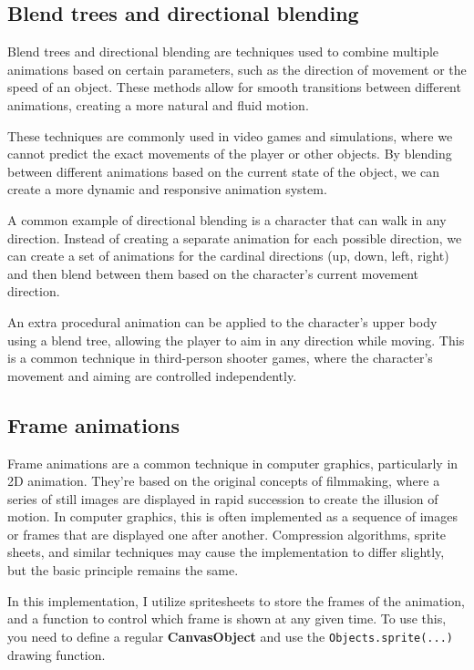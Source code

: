 \subsection{Blend trees and directional blending}
\label{subsec:blend-trees-directional-blending}

Blend trees and directional blending are techniques used to combine multiple animations based on certain parameters, such as the direction of movement or the speed of an object. These methods allow for smooth transitions between different animations, creating a more natural and fluid motion.

These techniques are commonly used in video games and simulations, where we cannot predict the exact movements of the player or other objects. By blending between different animations based on the current state of the object, we can create a more dynamic and responsive animation system.

A common example of directional blending is a character that can walk in any direction. Instead of creating a separate animation for each possible direction, we can create a set of animations for the cardinal directions (up, down, left, right) and then blend between them based on the character's current movement direction.

An extra procedural animation can be applied to the character's upper body using a blend tree, allowing the player to aim in any direction while moving. This is a common technique in third-person shooter games, where the character's movement and aiming are controlled independently.

\vspace{60pt}

\subsection{Frame animations}
\label{subsec:frame-animations}

Frame animations are a common technique in computer graphics, particularly in 2D animation. They're based on the original concepts of filmmaking, where a series of still images are displayed in rapid succession to create the illusion of motion. In computer graphics, this is often implemented as a sequence of images or frames that are displayed one after another. Compression algorithms, sprite sheets, and similar techniques may cause the implementation to differ slightly, but the basic principle remains the same.

\begin{Note}
    In this implementation, I utilize spritesheets to store the frames of the animation, and a function to control which frame is shown at any given time. To use this, you need to define a regular \textbf{CanvasObject} and use the {\footnotesize\texttt{Objects.sprite(...)}} drawing function.
\end{Note}


